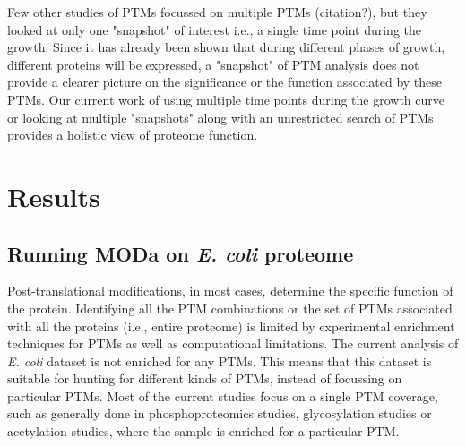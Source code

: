 \documentclass[12pt]{article}
\begin{document}
Few other studies of PTMs focussed on multiple PTMs (citation?), but they looked at only one "snapshot" of interest i.e., a single time point during the growth. Since it has already been shown that during different phases of growth, different proteins will be expressed, a "snapshot" of PTM analysis does not provide a clearer picture on the significance or the function associated by these PTMs. Our current work of using multiple time points during the growth curve or looking at multiple "snapshots" along with an unrestricted search of PTMs provides a holistic view of proteome function. 



\section{Results}

\subsection{Running MODa on \emph{E. coli} proteome}
Post-translational modifications, in most cases, determine the specific function of the protein. Identifying all the PTM combinations or the set of PTMs associated with all the proteins (i.e., entire proteome) is limited by experimental enrichment techniques for PTMs as well as computational limitations. The current analysis of \emph{E. coli} dataset is not enriched for any PTMs. This means that this dataset is suitable for hunting for different kinds of PTMs, instead of focussing on particular PTMs. Most of the current studies focus on a single PTM coverage, such as generally done in phosphoproteomics studies, glycosylation studies or acetylation studies, where the sample is enriched for a particular PTM. 
\end{document}
